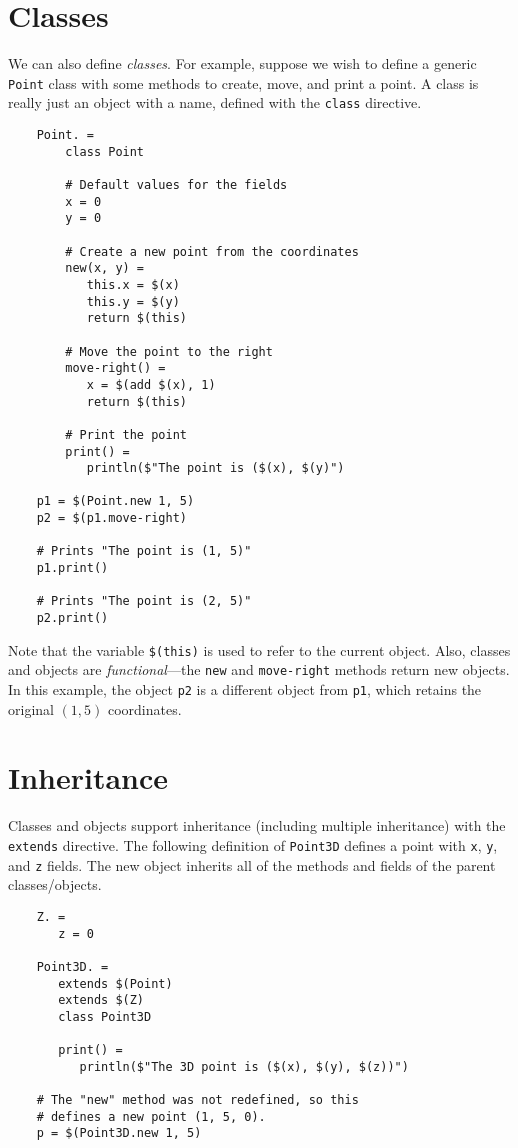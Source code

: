 \section{Classes}

We can also define \emph{classes}.  For example, suppose we wish to define a generic \verb+Point+
class with some methods to create, move, and print a point.  A class is really just an object with
a name, defined with the \verb+class+ directive.

\begin{verbatim}
    Point. =
        class Point

        # Default values for the fields
        x = 0
        y = 0

        # Create a new point from the coordinates
        new(x, y) =
           this.x = $(x)
           this.y = $(y)
           return $(this)

        # Move the point to the right
        move-right() =
           x = $(add $(x), 1)
           return $(this)

        # Print the point
        print() =
           println($"The point is ($(x), $(y)")

    p1 = $(Point.new 1, 5)
    p2 = $(p1.move-right)

    # Prints "The point is (1, 5)"
    p1.print()

    # Prints "The point is (2, 5)"
    p2.print()
\end{verbatim}

Note that the variable \verb+$(this)+ is used to refer to the current object.  Also, classes and
objects are \emph{functional}---the \verb+new+ and \verb+move-right+ methods return new objects.  In
this example, the object \verb+p2+ is a different object from \verb+p1+, which retains the original
$(1, 5)$ coordinates.

\section{Inheritance}

Classes and objects support inheritance (including multiple inheritance) with the \verb+extends+
directive.  The following definition of \verb+Point3D+ defines a point with \verb+x+, \verb+y+, and
\verb+z+ fields.  The new object inherits all of the methods and fields of the parent classes/objects.

\begin{verbatim}
    Z. =
       z = 0

    Point3D. =
       extends $(Point)
       extends $(Z)
       class Point3D

       print() =
          println($"The 3D point is ($(x), $(y), $(z))")

    # The "new" method was not redefined, so this
    # defines a new point (1, 5, 0).
    p = $(Point3D.new 1, 5)
\end{verbatim}


